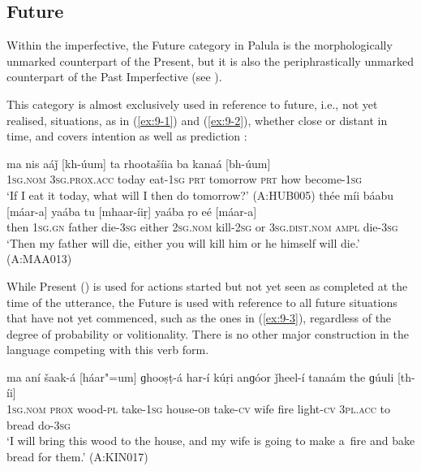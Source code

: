 \subsection{Future}
\label{subsec:9-1-2}


Within the imperfective, the Future category in Palula is the morphologically unmarked counterpart of the Present, but it is also the periphrastically unmarked counterpart of the Past Imperfective (see ). 



This category is almost exclusively used in reference to future, i.e., not yet realised, situations, as in (\ref{ex:9-1}) and (\ref{ex:9-2}), whether close or distant in time, and covers intention as well as prediction \citep[105--108]{dahl1985}:


\begin{exe}
\ex
\label{ex:9-1}
\gll ma nis aáǰ [kh-úum] ta rhootašíia ba kanaá [bh-úum]  \\
\textsc{1sg.nom} \textsc{3}\textsc{sg.prox.acc} today eat-\textsc{1sg} \textsc{prt} tomorrow  \textsc{prt} how become-\textsc{1sg}\\
\glt `If I eat it today, what will I then do tomorrow?' (A:HUB005)
\ex
\label{ex:9-2}
\gll thée míi báabu [máar-a] yaába tu [mhaar-íiṛ] yaába ṛo eé [máar-a] \\
then \textsc{1sg.gn} father die-\textsc{3sg} either \textsc{2sg.nom} kill-\textsc{2sg}  or \textsc{3sg.dist.nom} \textsc{ampl} die-\textsc{3sg}  \\
\glt `Then my father will die, either you will kill him or he himself will die.' (A:MAA013)
\end{exe}

While Present () is used for actions started but not yet seen as completed at the time of the utterance, the Future is used with reference to all future situations that have not yet commenced, such as the ones in (\ref{ex:9-3}), regardless of the degree of probability or volitionality. There is no other major construction in the language competing with this verb form.

\begin{exe}
\ex
\label{ex:9-3}
\gll ma aní šaak-á [háar"=um] ɡhooṣṭ-á har-í kúṛi anɡóor ǰheel-í tanaám the ɡúuli [th-íi] \\
\textsc{1sg.nom} \textsc{prox} wood-\textsc{pl} take-\textsc{1sg} house-\textsc{ob} take-\textsc{cv}  wife fire light-\textsc{cv } \textsc{3pl.acc} to bread do-\textsc{3sg} \\
\glt `I will bring this wood to the house, and my wife is going to make a~fire and bake bread for
them.' (A:KIN017)
\end{exe}


